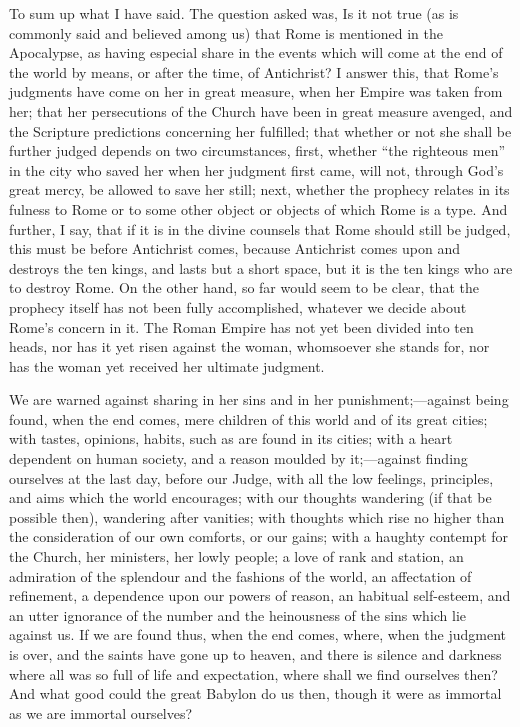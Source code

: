 To sum up what I have said. The question asked was, Is it not true
(as is commonly said and believed among us) that Rome is mentioned in
the Apocalypse, as having especial share in the events which will come
at the end of the world by means, or after the time, of Antichrist? I
answer this, that Rome's judgments have come on her in great measure,
when her Empire was taken from her; that her persecutions of the
Church have been in great measure avenged, and the Scripture
predictions concerning her fulfilled; that whether or not she shall be
further judged depends on two circumstances, first, whether ``the
righteous men'' in the city who saved her when her judgment first
came, will not, through God's great mercy, be allowed to save her
still; next, whether the prophecy relates in its fulness to Rome or to
some other object or objects of which Rome is a type. And further, I
say, that if it is in the divine counsels that Rome should still be
judged, this must be before Antichrist comes, because Antichrist comes
upon and destroys the ten kings, and lasts but a short space, but it
is the ten kings who are to destroy Rome. On the other hand, so far
would seem to be clear, that the prophecy itself has not been fully
accomplished, whatever we decide about Rome's concern in it. The Roman
Empire has not yet been divided into ten heads, nor has it yet risen
against the woman, whomsoever she stands for, nor has the woman yet
received her ultimate judgment.

We are warned against sharing in her sins and in her punishment;—against
being found, when the end comes, mere children of this world and of
its great cities; with tastes, opinions, habits, such as are found in
its cities; with a heart dependent on human society, and a reason
moulded by it;—against finding ourselves at the last day, before our
Judge, with all the low feelings, principles, and aims which the world
encourages; with our thoughts wandering (if that be possible then),
wandering after vanities; with thoughts which rise no higher than the
consideration of our own comforts, or our gains; with a haughty
contempt for the Church, her ministers, her lowly people; a love of
rank and station, an admiration of the splendour and the fashions of
the world, an affectation of refinement, a dependence upon our powers
of reason, an habitual self-esteem, and an utter ignorance of the
number and the heinousness of the sins which lie against us. If we are
found thus, when the end comes, where, when the judgment is over, and
the saints have gone up to heaven, and there is silence and darkness
where all was so full of life and expectation, where shall we find
ourselves then? And what good could the great Babylon do us then,
though it were as immortal as we are immortal ourselves?

